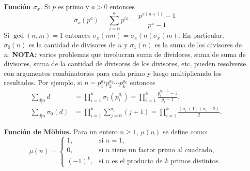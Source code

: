\textbf{Función $\sigma_x$}. Si $p$ es primo y $a > 0$ entonces
$$\sigma_x(p^{a}) = \sum_{i = 0}^a p^{ix} = \frac{p^{x(a + 1)} - 1}{p^x - 1}.$$
Si $\gcd(n, m) = 1$ entonces $\sigma_x(nm) = \sigma_x(n)\sigma_x(m)$. En particular, $\sigma_0(n)$ es la cantidad de divisores de $n$ y $\sigma_1(n)$ es la suma de los divisores de $n$. \textbf{NOTA:} varios problemas que involucran suma de dividores, suma de suma de divisores, suma de la cantidad de divisores de los divisores, etc, pueden resolverse con argumentos combinatorios para cada primo y luego multiplicando los resultados. Por ejemplo, si $n = p_1^{a_1}p_2^{a_2}\cdots p_k^{a_k}$ entonces
\begin{align*}
    \sum_{d | n} d &= \prod_{i = 1}^k \sigma_1 \left(p_i^{a_i}\right) = \prod_{i = 1}^k \frac{p_i^{a_i + 1} - 1}{p_i - 1},\\
    \sum_{d | n} \sigma_0(d) &= \prod_{i = 1}^k \sum_{j = 0}^{a_i} (j + 1) = \prod_{i = 1}^k \frac{(a_i + 1)(a_i + 2)}{2}.
\end{align*}



\textbf{Función de Möbius.} Para un entero $n \geq 1$, $\mu(n)$ se define como:
$$\mu(n) = \begin{cases}
1, & \text{si } n = 1, \\
0, & \text{si } n \text{ tiene un factor primo al cuadrado}, \\
(-1)^k, & \text{si } n \text{ es el producto de } k \text{ primos distintos}.
\end{cases}$$




